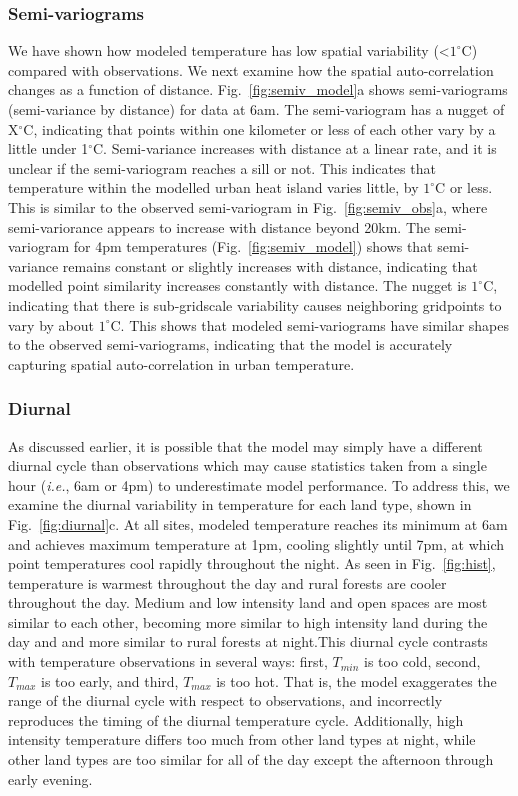 \documentclass[draft,linenumbers]{agujournal}
\begin{document}
\subsubsection{Semi-variograms}
We have shown how modeled temperature has low spatial variability (<$1^\circ$C) compared with observations. We next examine how the spatial auto-correlation changes as a function of distance. Fig.~\ref{fig:semiv_model}a shows semi-variograms (semi-variance  by distance) for data at 6am. The semi-variogram has a nugget of X$^\circ$C, indicating that points within one kilometer or less of each other vary by a little under 1$^\circ$C. Semi-variance increases with distance at a linear rate, and it is unclear if the semi-variogram reaches a sill or not. This indicates that temperature within the modelled urban heat island varies little, by $1^\circ$C or less. This is similar to the observed semi-variogram in Fig.~\ref{fig:semiv_obs}a, where semi-variorance appears to increase with distance beyond 20km. The semi-variogram for 4pm temperatures (Fig.~\ref{fig:semiv_model}) shows that semi-variance remains constant or slightly increases with distance, indicating that modelled point similarity increases constantly with distance. The nugget is $1^\circ$C, indicating that there is sub-gridscale variability causes neighboring gridpoints to vary by about $1^\circ$C. 
This shows that modeled semi-variograms have similar shapes to the observed semi-variograms, indicating that the model is accurately capturing spatial auto-correlation in urban temperature. %


\subsubsection{Diurnal}
As discussed earlier, it is possible that the model may simply have a different diurnal cycle than observations which may cause statistics taken from a single hour (\textit{i.e.}, 6am or 4pm) to underestimate model performance. To address this, we examine the diurnal variability in temperature for each land type, shown in Fig.~\ref{fig:diurnal}c. At all sites, modeled temperature reaches its minimum at 6am and achieves maximum temperature at 1pm, cooling slightly until  7pm, at which point temperatures cool rapidly throughout the night. As seen in Fig.~\ref{fig:hist}, 
temperature is warmest throughout the day and rural forests are cooler throughout the day. Medium and low intensity land and open spaces are most similar to each other, becoming more similar to high intensity land during the day and and more similar to rural forests at night.This diurnal cycle contrasts with temperature observations in several ways: first, $T_{min}$ is too cold, second, $T_{max}$ is too early, and third, $T_{max}$ is too hot. That is, the model exaggerates the range of the diurnal cycle with respect to observations, and incorrectly reproduces the timing of the diurnal temperature cycle. Additionally, high intensity temperature differs too much from other land types at night, while other land types are too similar for all of the day except the afternoon through early evening. 
 
\end{document}
